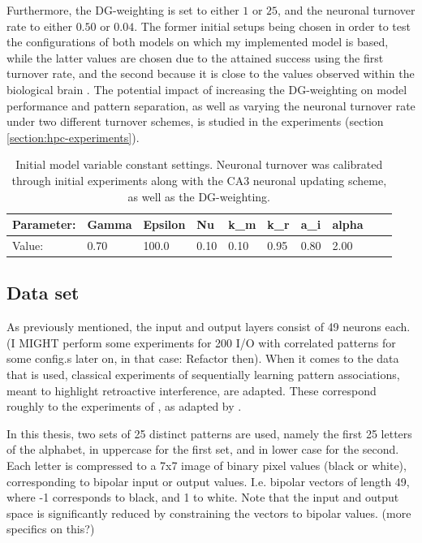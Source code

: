 Furthermore, the DG-weighting is set to either $1$ or $25$, and the neuronal turnover rate to either $0.50$ or $0.04$. The former initial setups being chosen in order to test the configurations of both models on which my implemented model is based, while the latter values are chosen due to the attained success using the first turnover rate, and the second because it is close to the values observed within the biological brain \citep{Rolls1998chpt6}.
The potential impact of increasing the DG-weighting on model performance and pattern separation, as well as varying the neuronal turnover rate under two different turnover schemes, is studied in the experiments (section \ref{section:hpc-experiments}).

\begin{table}
\centering
\caption{Initial model variable constant settings. Neuronal turnover was calibrated through initial experiments along with the CA3 neuronal updating scheme, as well as the DG-weighting.}
\label{table:initial_settings}
\begin{tabular}{|l|l|l|l|l|l|l|l|l|l|}
\cline{1-8}
Parameter: & Gamma & Epsilon & Nu   & k\_m & k\_r & a\_i & alpha \\ \hline
Value:     & 0.70  & 100.0   & 0.10 & 0.10 & 0.95 & 0.80 & 2.00 \\ \hline
\end{tabular}
\end{table}

\subsection{Data set}
As previously mentioned, the input and output layers consist of 49 neurons each. (I MIGHT perform some experiments for 200 I/O with correlated patterns for some config.s later on, in that case: Refactor then). 
When it comes to the data that is used, classical experiments of sequentially learning pattern associations, meant to highlight retroactive interference, are adapted. These correspond roughly to the experiments of \citep{McCloskey1989}, as adapted by \citep{French1997, Hattori2010, Hattori2014}.

In this thesis, two sets of 25 distinct patterns are used, namely the first 25 letters of the alphabet, in uppercase for the first set, and in lower case for the second. Each letter is compressed to a 7x7 image of binary pixel values (black or white), corresponding to bipolar input or output values. I.e. bipolar vectors of length 49, where -1 corresponds to black, and 1 to white. Note that the input and output space is significantly reduced by constraining the vectors to bipolar values. (more specifics on this?)

